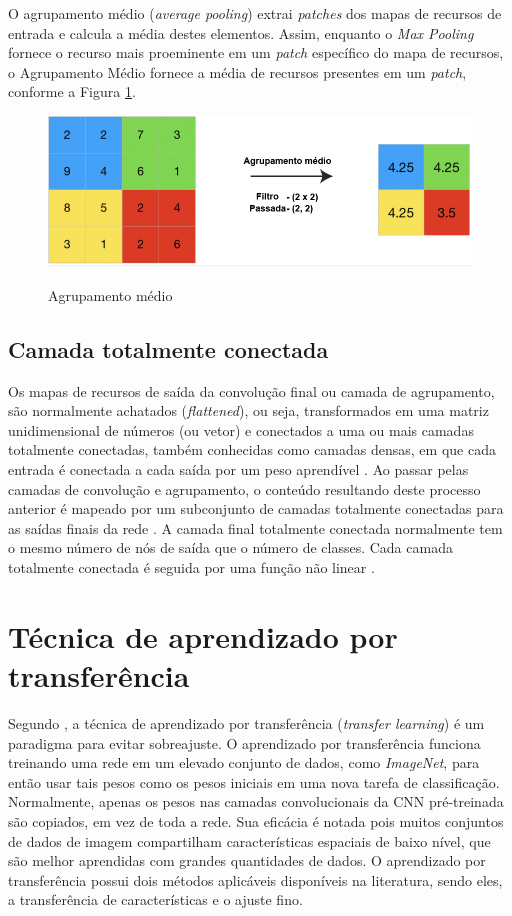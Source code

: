 \documentclass[
	12pt,				%
	oneside,			%
	a4paper,			%
	english,			%
	brazil				%
	]{abntex2ppgsi}
\begin{document}
O agrupamento médio (\textit{average pooling}) extrai \textit{patches} dos mapas de recursos de entrada e calcula a média destes elementos. Assim, enquanto o \textit{Max Pooling} fornece o recurso mais proeminente em um \textit{patch} específico do mapa de recursos, o Agrupamento Médio fornece a média de recursos presentes em um \textit{patch}, conforme a Figura \ref{fig:average_pooling}.

\begin{figure}[H]
    \centering
    \caption{Agrupamento médio}
    \includegraphics[scale=.45]{imagens/conceitos_basicos/average_pooling.jpg}
    \label{fig:average_pooling}
\end{figure}

\subsection{Camada totalmente conectada}
Os mapas de recursos de saída da convolução final ou camada de agrupamento, são normalmente achatados (\textit{flattened}), ou seja, transformados em uma matriz unidimensional de números (ou vetor) e conectados a uma ou mais camadas totalmente conectadas, também conhecidas como camadas densas, em que cada entrada é conectada a cada saída por um peso aprendível \cite{yamashita2018convolutional}. Ao passar pelas camadas de convolução e agrupamento, o conteúdo resultando deste processo anterior é mapeado por um subconjunto de camadas totalmente conectadas para as saídas finais da rede \cite{yamashita2018convolutional}. A camada final totalmente conectada normalmente tem o mesmo número de nós de saída que o número de classes. Cada camada totalmente conectada é seguida por uma função não linear \cite{yamashita2018convolutional}.

\section{Técnica de aprendizado por transferência}
Segundo , a técnica de aprendizado por transferência (\textit{transfer learning}) é um paradigma para evitar sobreajuste. O aprendizado por transferência funciona treinando uma rede em um elevado conjunto de dados, como \textit{ImageNet}, para então usar tais pesos como os pesos iniciais em uma nova tarefa de classificação. Normalmente, apenas os pesos nas camadas convolucionais da CNN pré-treinada são copiados, em vez de toda a rede. Sua eficácia é notada pois muitos conjuntos de dados de imagem compartilham características espaciais de baixo nível, que são melhor aprendidas com grandes quantidades de dados. O aprendizado por transferência possui dois métodos aplicáveis disponíveis na literatura, sendo eles, a transferência de características e o ajuste fino.
\end{document}

